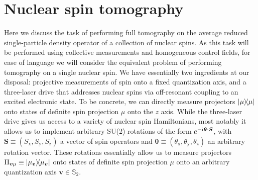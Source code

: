 \documentclass[nofootinbib,notitlepage,11pt]{revtex4-2}
\newcommand{\p}[1]{\left(#1\right)} %
\renewcommand{\v}{\bm} %
\renewcommand{\c}{\cdot} %
\renewcommand{\i}{\mathrm{i}\mkern1mu} %
\newcommand{\1}{\mathds{1}}
\newcommand{\x}{\text{x}}
\newcommand{\y}{\text{y}}
\newcommand{\z}{\text{z}}
\renewcommand{\SS}{\mathbb{S}}
\begin{document}
\section{Nuclear spin tomography}

Here we discuss the task of performing full tomography on the average reduced single-particle density operator of a collection of nuclear spins.
As this task will be performed using collective measurements and homogeneous control fields, for ease of language we will consider the equivalent problem of performing tomography on a single nuclear spin.
We have essentially two ingredients at our disposal: projective measurements of spin onto a fixed quantization axis, and a three-laser drive that addresses nuclear spins via off-resonant coupling to an excited electronic state.
To be concrete, we can directly measure projectors $\op{\mu}$ onto states of definite spin projection $\mu$ onto the $z$ axis.
While the three-laser drive gives us access to a variety of nuclear spin Hamiltonians, most notably it allows us to implement arbitrary SU(2) rotations of the form $e^{-\i\v\theta\c\v S}$, with $\v S\equiv\p{S_\x,S_\y,S_\z}$ a vector of spin operators and $\v\theta\equiv\p{\theta_\x,\theta_\y,\theta_\z}$ an arbitrary rotation vector.
These rotations essentially allow us to measure projectors $\Pi_{\v v\mu} \equiv \op{\mu_{\v v}}$ onto states of definite spin projection $\mu$ onto an arbitrary quantization axis $\v v\in\SS_2$.
\end{document}

